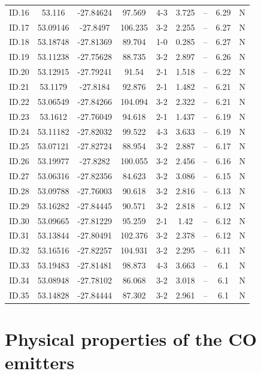 \begin{table}[!htbp]
\begin{tabular}{ccccccccc}
ID.16 & 53.116 & -27.84624 & 97.569 & 4-3 & 3.725 & -- & 6.29 & N \\
ID.17 & 53.09146 & -27.8497 & 106.235 & 3-2 & 2.255 & -- & 6.27 & N \\
ID.18 & 53.18748 & -27.81369 & 89.704 & 1-0 & 0.285 & -- & 6.27 & N \\
ID.19 & 53.11238 & -27.75628 & 88.735 & 3-2 & 2.897 & -- & 6.26 & N \\
ID.20 & 53.12915 & -27.79241 & 91.54 & 2-1 & 1.518 & -- & 6.22 & N \\
ID.21 & 53.1179 & -27.8184 & 92.876 & 2-1 & 1.482 & -- & 6.21 & N \\
ID.22 & 53.06549 & -27.84266 & 104.094 & 3-2 & 2.322 & -- & 6.21 & N \\
ID.23 & 53.1612 & -27.76049 & 94.618 & 2-1 & 1.437 & -- & 6.19 & N \\
ID.24 & 53.11182 & -27.82032 & 99.522 & 4-3 & 3.633 & -- & 6.19 & N \\
ID.25 & 53.07121 & -27.82724 & 88.954 & 3-2 & 2.887 & -- & 6.17 & N \\
ID.26 & 53.19977 & -27.8282 & 100.055 & 3-2 & 2.456 & -- & 6.16 & N \\
ID.27 & 53.06316 & -27.82356 & 84.623 & 3-2 & 3.086 & -- & 6.15 & N \\
ID.28 & 53.09788 & -27.76003 & 90.618 & 3-2 & 2.816 & -- & 6.13 & N \\
ID.29 & 53.16282 & -27.84445 & 90.571 & 3-2 & 2.818 & -- & 6.12 & N \\
ID.30 & 53.09665 & -27.81229 & 95.259 & 2-1 & 1.42 & -- & 6.12 & N \\
ID.31 & 53.13844 & -27.80491 & 102.376 & 3-2 & 2.378 & -- & 6.12 & N \\
ID.32 & 53.16516 & -27.82257 & 104.931 & 3-2 & 2.295 & -- & 6.11 & N \\
ID.33 & 53.19483 & -27.81481 & 98.873 & 4-3 & 3.663 & -- & 6.1 & N \\
ID.34 & 53.08948 & -27.78102 & 86.068 & 3-2 & 3.018 & -- & 6.1 & N \\
ID.35 & 53.14828 & -27.84444 & 87.302 & 3-2 & 2.961 & -- & 6.1 & N \\
\end{tabular}
\end{table}\label{table:Catalog}

\section{Physical properties of the CO emitters}

